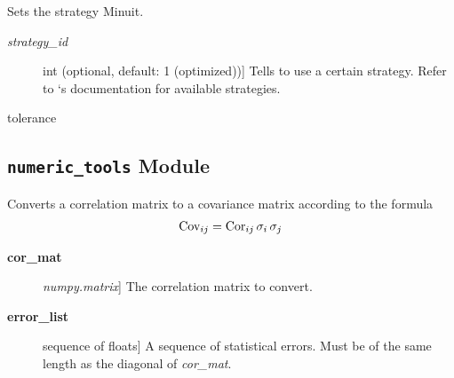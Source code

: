 \documentclass[a4paper,10pt,english]{sphinxmanual}
\begin{document}
\begin{fulllineitems}

\begin{fulllineitems}
\label{index:kafe.minuit.Minuit.set_strategy}
Sets the strategy Minuit.
\begin{description}
\item[{\emph{strategy\_id}}] \leavevmode{[}int (optional, default: 1 (optimized)){]}
Tells  to use a certain strategy. Refer to `s
documentation for available strategies.

\end{description}

\end{fulllineitems}


\begin{fulllineitems}
\label{index:kafe.minuit.Minuit.tolerance}
 tolerance

\end{fulllineitems}


\end{fulllineitems}



\subsection{\texttt{numeric\_tools} Module}
\label{index:module-kafe.numeric_tools}\label{index:numeric-tools-module}\label{index:module-numeric_tools}

\begin{fulllineitems}
\label{index:kafe.numeric_tools.cor_to_cov}
Converts a correlation matrix to a covariance matrix according to the formula
\begin{gather}
\begin{split}\text{Cov}_{ij} = \text{Cor}_{ij}\, \sigma_i \, \sigma_j\end{split}\notag
\end{gather}\begin{description}
\item[{\textbf{cor\_mat}}] \leavevmode{[}\emph{numpy.matrix}{]}
The correlation matrix to convert.

\item[{\textbf{error\_list}}] \leavevmode{[}sequence of floats{]}
A sequence of statistical errors. Must be of the same length
as the diagonal of \emph{cor\_mat}.

\end{description}

\end{fulllineitems}
\end{document}
